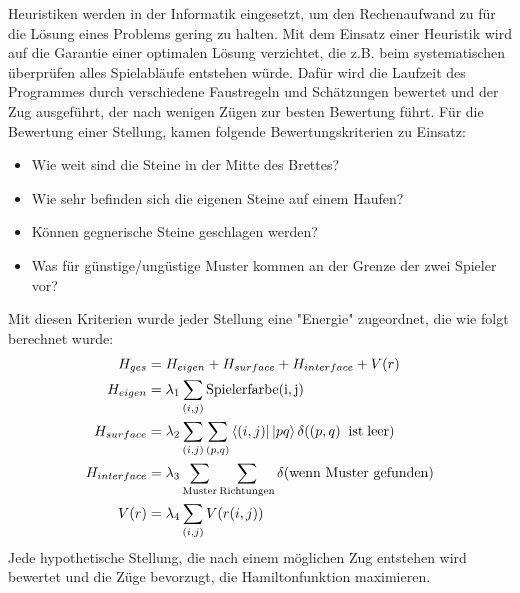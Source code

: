 Heuristiken werden in der Informatik eingesetzt, um den Rechenaufwand zu für
die Lösung eines Problems gering zu halten. Mit dem Einsatz einer Heuristik wird
auf die Garantie einer optimalen Lösung verzichtet, die z.B. beim systematischen 
überprüfen alles Spielabläufe entstehen würde. Dafür wird die Laufzeit des 
Programmes durch verschiedene Faustregeln und Schätzungen bewertet und der Zug 
ausgeführt, der nach wenigen Zügen zur besten Bewertung führt.
Für die Bewertung einer Stellung, kamen folgende Bewertungskriterien
zu Einsatz:
\begin{itemize}
	\item Wie weit sind die Steine in der Mitte des Brettes?
	\item Wie sehr befinden sich die eigenen Steine auf einem Haufen?
	\item Können gegnerische Steine geschlagen werden?
	\item Was für günstige/ungüstige Muster kommen an der Grenze der zwei Spieler vor?
\end{itemize}
Mit diesen Kriterien wurde jeder Stellung eine "Energie" zugeordnet, die wie folgt
berechnet wurde:
\begin{align*}
	H_{ges} &= H_{eigen} + H_{surface} + H_{interface} + V(r)\\
H_{eigen} &=  \lambda_{1} \sum_{(i,j)} \rm{Spielerfarbe}(i,j)\\
H_{surface} &= \lambda_{2} \sum_{(i,j)} \sum_{(p,q)} \left \langle (i,j)\right| \left|  pq\right\rangle  \delta((p,q) \; \; \rm{ist \;leer})\\
H_{interface} &= \lambda_{3} \sum_{\rm{Muster}} \sum_{\rm{Richtungen}} \delta( \text{wenn Muster gefunden}) \\\ 
V(r) &= \lambda_{4}  \sum_{(i,j)}  V(r(i,j))
\end{align*}
Jede hypothetische Stellung, die nach einem möglichen Zug entstehen wird bewertet
und die Züge bevorzugt, die Hamiltonfunktion maximieren.

